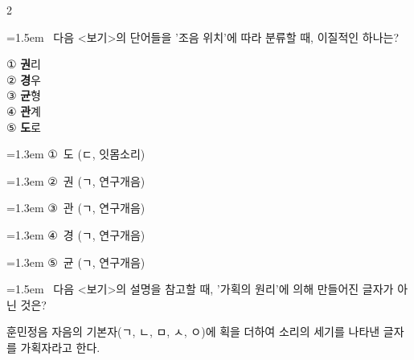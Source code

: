 \documentclass[10pt, a4paper]{article}
\begin{document}
\begin{multicols}{2}
\noindent\begin{minipage}{\columnwidth}
\vspace{2mm}
{\hangindent=1.5em  ~다음 <보기>의 단어들을 '조음 위치'에 따라 분류할 때, 이질적인 하나는?\par}

\vspace{1mm}
\begin{boxibox}
① \textbf{권}리 \\
② \textbf{경}우 \\
③ \textbf{균}형 \\
④ \textbf{관}계 \\
⑤ \textbf{도}로 \\
\end{boxibox}
\vspace{1mm}

\vspace{0.5mm}
{\hangindent=1.3em  \noindent\hspace{0.3em}①~도 (ㄷ, 잇몸소리)\par}
{\hangindent=1.3em  \noindent\hspace{0.3em}②~권 (ㄱ, 연구개음)\par}
{\hangindent=1.3em  \noindent\hspace{0.3em}③~관 (ㄱ, 연구개음)\par}
{\hangindent=1.3em  \noindent\hspace{0.3em}④~경 (ㄱ, 연구개음)\par}
{\hangindent=1.3em  \noindent\hspace{0.3em}⑤~균 (ㄱ, 연구개음)\par}
\vspace{4mm}
\end{minipage}
\par

\noindent\begin{minipage}{\columnwidth}
\vspace{2mm}
{\hangindent=1.5em  ~다음 <보기>의 설명을 참고할 때, '가획의 원리'에 의해 만들어진 글자가 아닌 것은?\par}

\vspace{1mm}
\begin{boxibox}
훈민정음 자음의 기본자(ㄱ, ㄴ, ㅁ, ㅅ, ㅇ)에 획을 더하여 소리의 세기를 나타낸 글자를 가획자라고 한다. \\
\end{boxibox}
\vspace{1mm}


\end{minipage}
\end{multicols}
\end{document}
